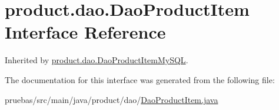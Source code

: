 \hypertarget{interfaceproduct_1_1dao_1_1_dao_product_item}{}\section{product.\+dao.\+Dao\+Product\+Item Interface Reference}
\label{interfaceproduct_1_1dao_1_1_dao_product_item}


Inherited by \mbox{\hyperlink{classproduct_1_1dao_1_1_dao_product_item_my_s_q_l}{product.\+dao.\+Dao\+Product\+Item\+My\+S\+QL}}.



The documentation for this interface was generated from the following file\+:\begin{DoxyCompactItemize}
\item 
pruebas/src/main/java/product/dao/\mbox{\hyperlink{_dao_product_item_8java}{Dao\+Product\+Item.\+java}}\end{DoxyCompactItemize}
